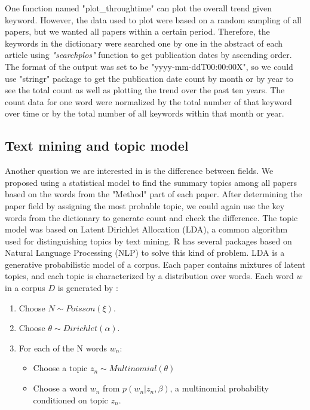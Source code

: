 \documentclass[11pt]{article}
\begin{document}
One function named "plot\_throughtime" can plot the overall trend given keyword. However, the data used to plot were based on a random sampling of all papers, but we wanted all papers within a certain period. Therefore, the keywords in the dictionary were searched one by one in the abstract of each article using \textit{"searchplos"} function to get publication dates by ascending order. The format of the output was set to be "yyyy-mm-ddT00:00:00X", so we could use "stringr" package \cite{stringr} to get the publication date count by month or by year to see the total count as well as plotting the trend over the past ten years. The count data for one word were normalized by the total number of that keyword over time or by the total number of all keywords within that month or year. 

\subsection{Text mining and topic model}

Another question we are interested in is the difference between fields. We proposed using a statistical model to find the summary topics among all papers based on the words from the "Method" part of each paper. After determining the paper field by assigning the most probable topic, we could again use the key words from the dictionary to generate count and check the difference. The topic model was based on Latent Dirichlet Allocation (LDA), a common algorithm used for distinguishing topics by text mining. R has several packages based on Natural Language Processing (NLP) to solve this kind of problem. LDA is a generative probabilistic model of a corpus. Each paper contains mixtures of latent topics, and each topic is characterized by a distribution over words. Each word $w$ in a corpus $D$ is generated by \cite{LDA}:
\begin{enumerate}
  \item Choose $N \sim Poisson(\xi)$.
  \item Choose $\theta \sim Dirichlet(\alpha)$.
  \item For each of the N words $w_n$:
\begin{itemize}
  \item Choose a topic $z_n \sim Multinomial(\theta)$
  \item Choose a word $w_n$ from $p(w_n | z_n, \beta)$, a multinomial probability conditioned on topic $z_n$.
  \end{itemize}
\end{enumerate}
\end{document}
